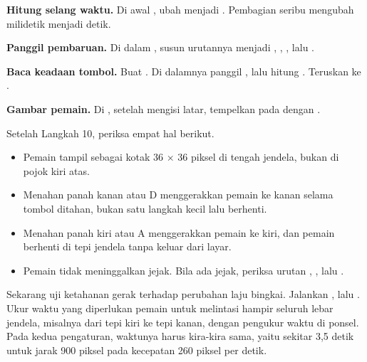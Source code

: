 \begin{langkah}
  \item \textbf{Hitung selang waktu.} Di awal , ubah
         menjadi
        .
        Pembagian seribu mengubah milidetik menjadi detik.

  \item \textbf{Panggil pembaruan.} Di dalam , susun urutannya
        menjadi , ,
        , lalu .

  \item \textbf{Baca keadaan tombol.} Buat .
        Di dalamnya panggil , lalu
        hitung .
        Teruskan  ke .

  \item \textbf{Gambar pemain.} Di , setelah mengisi latar,
        tempelkan  pada 
        dengan .
\end{langkah}

\begin{ujibox}
Setelah Langkah 10, periksa empat hal berikut.
\begin{itemize}[leftmargin=1.4em, itemsep=0.2em]
  \item Pemain tampil sebagai kotak 36 $\times$ 36 piksel di tengah jendela,
        bukan di pojok kiri atas.
  \item Menahan panah kanan atau D menggerakkan pemain ke kanan selama tombol
        ditahan, bukan satu langkah kecil lalu berhenti.
  \item Menahan panah kiri atau A menggerakkan pemain ke kiri, dan pemain
        berhenti di tepi jendela tanpa keluar dari layar.
  \item Pemain tidak meninggalkan jejak. Bila ada jejak, periksa urutan
        , , lalu .
\end{itemize}
\end{ujibox}

Sekarang uji ketahanan gerak terhadap perubahan laju bingkai. Jalankan
, lalu . Ukur waktu
yang diperlukan pemain untuk melintasi hampir seluruh lebar jendela, misalnya
dari tepi kiri ke tepi kanan, dengan pengukur waktu di ponsel. Pada kedua
pengaturan, waktunya harus kira-kira sama, yaitu sekitar 3,5 detik untuk jarak
900 piksel pada kecepatan 260 piksel per detik.

